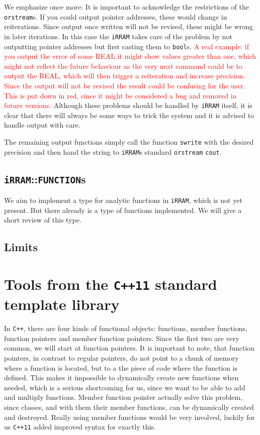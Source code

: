 \documentclass{article}
\newcommand{\irram}{\texttt{iRRAM}\xspace}
\newcommand{\irrams}{\texttt{iRRAM}s\xspace}
\newcommand{\cc}{\texttt{C++}\xspace}
\newcommand{\ccOx}{\texttt{C++11}\xspace}
\newcommand{\ir}[1]{\texttt{#1}}
\newcommand{\code}[1]{\texttt{#1}}
\newcommand{\temp}[1]{\textcolor{red}{#1}}
\begin{document}
We emphasize once more: It is important to acknowledge the restrictions of the \ir{orstream}s. If you could output pointer addresses, these would change in reiterations. Since output once written will not be revised, these might be wrong in later iterations. In this case the \irram takes care of the problem by not outputting pointer addresses but first casting them to \code{bool}s. \temp{A real example: if you output the error of some REAL it might show values greater than one, which might not reflect the future behaviour as the very next command could be to output the REAL, which will then trigger a reiteration and increase precision. Since the output will not be revised the result could be confusing for the user. This is put down in red, since it might be considered a bug and removed in future versions.} Although these problems should be handled by \irram itself, it is clear that there will always be some ways to trick the system and it is advised to handle output with care.

The remaining output functions simply call the function \ir{swrite} with the desired precision and then hand the string to \irrams standard \ir{orstream} \ir{cout}.

\subsection{\irram::\ir{FUNCTION}s}

We aim to implement a type for analytic functions in \irram, which is not yet present. But there already is a type of functions implemented. We will give a short review of this type.

\subsection{Limits}

\section{Tools from the \ccOx standard template library}

In \cc, there are four kinds of functional objects: functions, member functions, function pointers and member function pointers. Since the first two are very common, we will start at function pointers. It is important to note, that function pointers, in contrast to regular pointers, do not point to a chunk of memory where a function is located, but to a the piece of code where the function is defined. This makes it impossible to dynamically create new functions when needed, which is a serious shortcoming for us, since we want to be able to add and multiply functions. Member function pointer actually solve this problem, since classes, and with them their member functions, can be dynamically created and destroyed. Really using member functions would be very involved, luckily for us \ccOx added improved syntax for exactly this.
\end{document}
